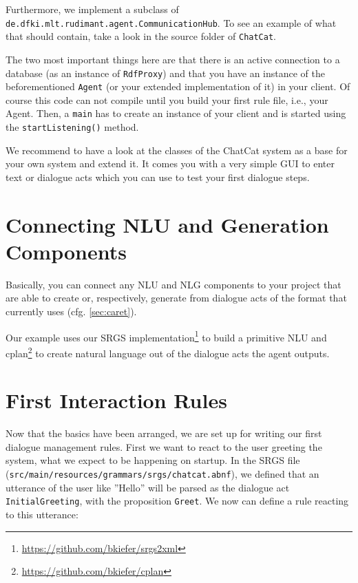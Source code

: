 Furthermore, we implement a subclass
of \texttt{de.dfki.mlt.rudimant.agent.CommunicationHub}. To see an example of
what that should contain, take a look in the source folder of \texttt{ChatCat}.

The two most important things here are that there is an active
connection to a database (as an instance of \texttt{RdfProxy}) and
that you have an instance of the beforementioned \vonda \texttt{Agent}
(or your extended implementation of it) in your client. Of course this
code can not compile until you build your first rule file, i.e., your
\vonda Agent. Then, a \texttt{main} has to create an instance of your
client and is started using the \texttt{startListening()} method.

We recommend to have a look at the classes of the ChatCat system as a base for
your own system and extend it. It comes you with a very simple GUI to enter
text or dialogue acts which you can use to test your first dialogue steps.

\section{Connecting NLU and Generation Components}

Basically, you can connect any NLU and NLG components to your project that are
able to create or, respectively, generate from dialogue acts of the format that
\vonda currently uses (cfg. \ref{sec:caret}).

Our example uses our SRGS
implementation\footnote{\url{https://github.com/bkiefer/srgs2xml}} to
build a primitive NLU and
cplan\footnote{\url{https://github.com/bkiefer/cplan}} to create
natural language out of the dialogue acts the agent outputs.

\section{First Interaction Rules}

Now that the basics have been arranged, we are set up for writing our first
dialogue management rules. First we want to react to the user greeting the
system, what we expect to be happening on startup. In the SRGS file
(\small\texttt{src/main/resources/grammars/srgs/chatcat.abnf}), we defined that
an utterance of the user like ''Hello'' will be parsed as the dialogue act
\texttt{InitialGreeting}, with the proposition \texttt{Greet}. We now can
define a rule reacting to this utterance:

